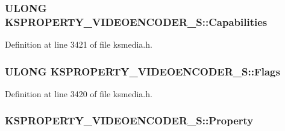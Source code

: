 \subsubsection[{\texorpdfstring{Capabilities}{Capabilities}}]{\setlength{\rightskip}{0pt plus 5cm}U\+L\+O\+NG K\+S\+P\+R\+O\+P\+E\+R\+T\+Y\+\_\+\+V\+I\+D\+E\+O\+E\+N\+C\+O\+D\+E\+R\+\_\+\+S\+::\+Capabilities}\hypertarget{struct_k_s_p_r_o_p_e_r_t_y___v_i_d_e_o_e_n_c_o_d_e_r___s_a4ddddfafae3ce0d9f7eaaf366d1c196a}{}\label{struct_k_s_p_r_o_p_e_r_t_y___v_i_d_e_o_e_n_c_o_d_e_r___s_a4ddddfafae3ce0d9f7eaaf366d1c196a}


Definition at line 3421 of file ksmedia.\+h.

\subsubsection[{\texorpdfstring{Flags}{Flags}}]{\setlength{\rightskip}{0pt plus 5cm}U\+L\+O\+NG K\+S\+P\+R\+O\+P\+E\+R\+T\+Y\+\_\+\+V\+I\+D\+E\+O\+E\+N\+C\+O\+D\+E\+R\+\_\+\+S\+::\+Flags}\hypertarget{struct_k_s_p_r_o_p_e_r_t_y___v_i_d_e_o_e_n_c_o_d_e_r___s_a4062339e269c8e7791a7ba7b7367fcc8}{}\label{struct_k_s_p_r_o_p_e_r_t_y___v_i_d_e_o_e_n_c_o_d_e_r___s_a4062339e269c8e7791a7ba7b7367fcc8}


Definition at line 3420 of file ksmedia.\+h.

\subsubsection[{\texorpdfstring{Property}{Property}}]{ K\+S\+P\+R\+O\+P\+E\+R\+T\+Y\+\_\+\+V\+I\+D\+E\+O\+E\+N\+C\+O\+D\+E\+R\+\_\+\+S\+::\+Property}\hypertarget{struct_k_s_p_r_o_p_e_r_t_y___v_i_d_e_o_e_n_c_o_d_e_r___s_ab09714314f816d1af281e0862eeba830}{}\label{struct_k_s_p_r_o_p_e_r_t_y___v_i_d_e_o_e_n_c_o_d_e_r___s_ab09714314f816d1af281e0862eeba830}


